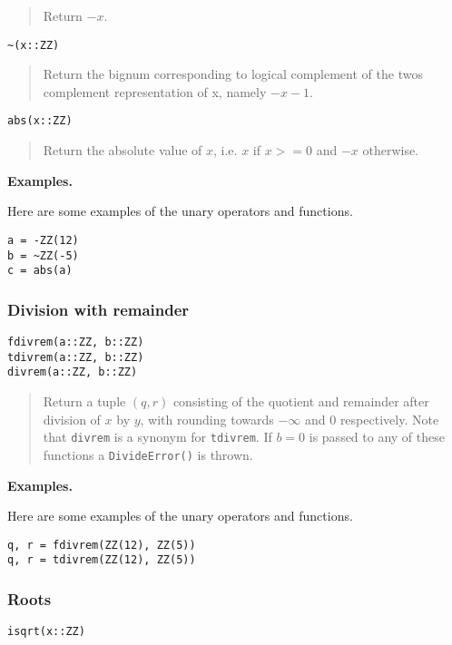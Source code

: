 \documentclass[a4paper,10pt]{article}
\newcommand{\code}{\lstinline}
\newcommand{\desc}[1]{\vspace{-3mm}\begin{quote}#1\end{quote}}
\begin{document}
{{{\desc{Return $-x$.}

\begin{lstlisting}
~(x::ZZ)
\end{lstlisting}

\desc{Return the bignum corresponding to logical complement of the twos 
complement representation of x, namely $-x - 1$.}

\begin{lstlisting}
abs(x::ZZ)
\end{lstlisting}

\desc{Return the absolute value of $x$, i.e. $x$ if $x >= 0$ and $-x$ otherwise.}

\textbf{Examples.}

Here are some examples of the unary operators and functions.

\begin{lstlisting}
a = -ZZ(12)
b = ~ZZ(-5)
c = abs(a)
\end{lstlisting}

\subsubsection{Division with remainder}

\begin{lstlisting}
fdivrem(a::ZZ, b::ZZ)
tdivrem(a::ZZ, b::ZZ)
divrem(a::ZZ, b::ZZ)
\end{lstlisting}

\desc{Return a tuple $(q, r)$ consisting of the quotient and remainder after 
division of $x$ by $y$, with rounding towards $-\infty$ and $0$ respectively. Note 
that \code{divrem} is a synonym for \code{tdivrem}. If $b = 0$ is passed to any
of these functions a \code{DivideError()} is thrown.}

\textbf{Examples.}

Here are some examples of the unary operators and functions.

\begin{lstlisting}
q, r = fdivrem(ZZ(12), ZZ(5))
q, r = tdivrem(ZZ(12), ZZ(5))
\end{lstlisting}

\subsubsection{Roots}

\begin{lstlisting}
isqrt(x::ZZ)
\end{lstlisting}

}}}
\end{document}
